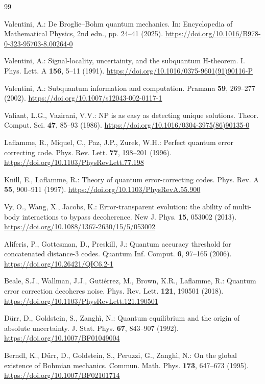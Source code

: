 \documentclass[pdflatex,sn-mathphys-num]{sn-jnl}
\theoremstyle{thmstyleone}
\begin{document}
\begin{thebibliography}{99}

Valentini, A.: De Broglie--Bohm quantum mechanics. In: Encyclopedia of Mathematical Physics, 2nd edn., pp. 24--41 (2025). \url{https://doi.org/10.1016/B978-0-323-95703-8.00264-0}

Valentini, A.: Signal-locality, uncertainty, and the subquantum H-theorem. I. Phys. Lett. A \textbf{156}, 5--11 (1991). \url{https://doi.org/10.1016/0375-9601(91)90116-P}

Valentini, A.: Subquantum information and computation. Pramana \textbf{59}, 269--277 (2002). \url{https://doi.org/10.1007/s12043-002-0117-1}

Valiant, L.G., Vazirani, V.V.: NP is as easy as detecting unique solutions. Theor. Comput. Sci. \textbf{47}, 85--93 (1986). \url{https://doi.org/10.1016/0304-3975(86)90135-0}

Laflamme, R., Miquel, C., Paz, J.P., Zurek, W.H.: Perfect quantum error correcting code. Phys. Rev. Lett. \textbf{77}, 198--201 (1996). \url{https://doi.org/10.1103/PhysRevLett.77.198}

Knill, E., Laflamme, R.: Theory of quantum error-correcting codes. Phys. Rev. A \textbf{55}, 900--911 (1997). \url{https://doi.org/10.1103/PhysRevA.55.900}

Vy, O., Wang, X., Jacobs, K.: Error-transparent evolution: the ability of multi-body interactions to bypass decoherence. New J. Phys. \textbf{15}, 053002 (2013). \url{https://doi.org/10.1088/1367-2630/15/5/053002}

Aliferis, P., Gottesman, D., Preskill, J.: Quantum accuracy threshold for concatenated distance-3 codes. Quantum Inf. Comput. \textbf{6}, 97--165 (2006). \url{https://doi.org/10.26421/QIC6.2-1}

Beale, S.J., Wallman, J.J., Guti\'errez, M., Brown, K.R., Laflamme, R.: Quantum error correction decoheres noise. Phys. Rev. Lett. \textbf{121}, 190501 (2018). \url{https://doi.org/10.1103/PhysRevLett.121.190501}

D\"urr, D., Goldstein, S., Zangh\`i, N.: Quantum equilibrium and the origin of absolute uncertainty. J. Stat. Phys. \textbf{67}, 843--907 (1992). \url{https://doi.org/10.1007/BF01049004}

Berndl, K., D\"urr, D., Goldstein, S., Peruzzi, G., Zangh\`i, N.: On the global existence of Bohmian mechanics. Commun. Math. Phys. \textbf{173}, 647--673 (1995). \url{https://doi.org/10.1007/BF02101714}

\end{thebibliography}
\end{document}
